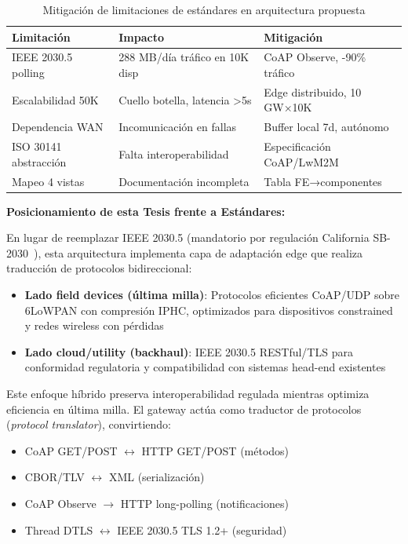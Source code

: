 \begin{table}[H]
\centering
\caption{Mitigación de limitaciones de estándares en arquitectura propuesta}
\label{tab:standards-mitigation}
\small
\begin{tabular}{|l|l|l|}
\hline
\rowcolor{gray!20}
\textbf{Limitación} & \textbf{Impacto} & \textbf{Mitigación} \\
\hline
IEEE 2030.5 polling & 288 MB/día tráfico en 10K disp & CoAP Observe, -90\% tráfico \\
\hline
Escalabilidad 50K & Cuello botella, latencia >5s & Edge distribuido, 10 GW×10K \\
\hline
Dependencia WAN & Incomunicación en fallas & Buffer local 7d, autónomo \\
\hline
ISO 30141 abstracción & Falta interoperabilidad & Especificación CoAP/LwM2M \\
\hline
Mapeo 4 vistas & Documentación incompleta & Tabla FE→componentes \\
\hline
\end{tabular}
\end{table}

\textbf{Posicionamiento de esta Tesis frente a Estándares:}

En lugar de reemplazar IEEE 2030.5 (mandatorio por regulación California SB-2030~\cite{CaliforniaCPUC2023}), esta arquitectura implementa capa de adaptación edge que realiza traducción de protocolos bidireccional:

\begin{itemize}
\item \textbf{Lado field devices (última milla)}: Protocolos eficientes CoAP/UDP sobre 6LoWPAN con compresión IPHC, optimizados para dispositivos constrained y redes wireless con pérdidas
\item \textbf{Lado cloud/utility (backhaul)}: IEEE 2030.5 RESTful/TLS para conformidad regulatoria y compatibilidad con sistemas head-end existentes
\end{itemize}

Este enfoque híbrido preserva interoperabilidad regulada mientras optimiza eficiencia en última milla. El gateway actúa como traductor de protocolos (\textit{protocol translator}), convirtiendo:

\begin{itemize}
\item CoAP GET/POST $\leftrightarrow$ HTTP GET/POST (métodos)
\item CBOR/TLV $\leftrightarrow$ XML (serialización)
\item CoAP Observe $\rightarrow$ HTTP long-polling (notificaciones)
\item Thread DTLS $\leftrightarrow$ IEEE 2030.5 TLS 1.2+ (seguridad)
\end{itemize}

